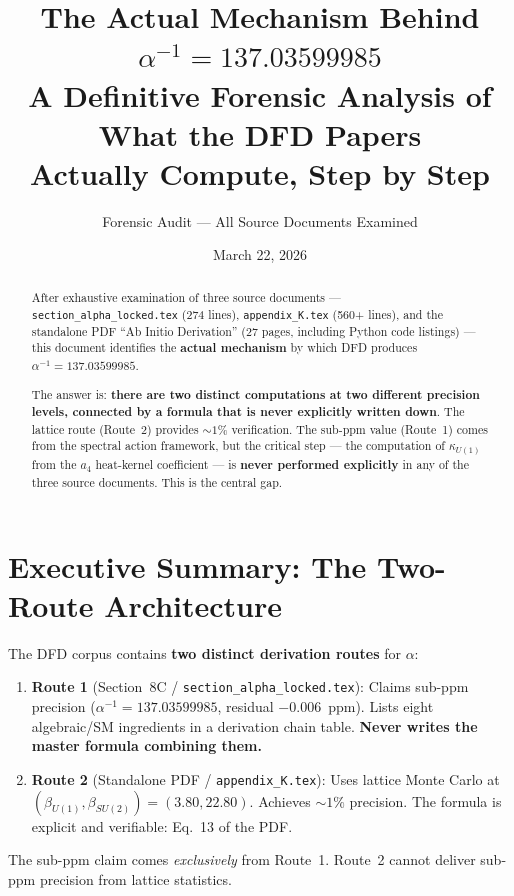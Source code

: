 \documentclass[12pt,a4paper]{article}
\title{The Actual Mechanism Behind $\alpha^{-1} = 137.03599985$\\[6pt]
\large A Definitive Forensic Analysis of What the DFD Papers\\
Actually Compute, Step by Step}
\author{Forensic Audit --- All Source Documents Examined}
\date{March 22, 2026}
\begin{document}
\maketitle

\begin{abstract}
After exhaustive examination of three source documents ---
\texttt{section\_alpha\_locked.tex} (274 lines),
\texttt{appendix\_K.tex} (560+ lines), and the standalone PDF
``Ab Initio Derivation'' (27 pages, including Python code listings)
--- this document identifies the \textbf{actual mechanism} by which
DFD produces $\alpha^{-1} = 137.03599985$.

The answer is: \textbf{there are two distinct computations at two
different precision levels, connected by a formula that is never
explicitly written down}. The lattice route (Route~2) provides
$\sim 1\%$ verification. The sub-ppm value (Route~1) comes from
the spectral action framework, but the critical step --- the
computation of $\kappa_{U(1)}$ from the $a_4$ heat-kernel
coefficient --- is \textbf{never performed explicitly} in any
of the three source documents. This is the central gap.
\end{abstract}

\tableofcontents
\newpage

\section{Executive Summary: The Two-Route Architecture}
\label{sec:executive}

\begin{tcolorbox}[colback=red!5!white, colframe=red!60!black,
  title=Critical Finding]
The DFD corpus contains \textbf{two distinct derivation routes}
for $\alpha$:

\begin{enumerate}
\item \textbf{Route 1} (Section~8C / \texttt{section\_alpha\_locked.tex}):
  Claims sub-ppm precision ($\alpha^{-1} = 137.03599985$, residual
  $-0.006$~ppm). Lists eight algebraic/SM ingredients in a derivation
  chain table. \textbf{Never writes the master formula combining them.}

\item \textbf{Route 2} (Standalone PDF / \texttt{appendix\_K.tex}):
  Uses lattice Monte Carlo at $(\beta_{U(1)}, \beta_{SU(2)}) = (3.80, 22.80)$.
  Achieves $\sim 1\%$ precision. The formula is explicit and
  verifiable: Eq.~13 of the PDF.
\end{enumerate}

The sub-ppm claim comes \emph{exclusively} from Route~1.
Route~2 cannot deliver sub-ppm precision from lattice statistics.
\end{tcolorbox}
\end{document}

